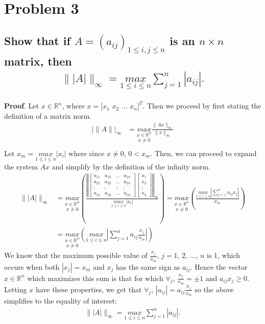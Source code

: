 \documentclass[11pt, letterpaper]{article}
\begin{document}
\section*{Problem 3}
\subsection*{\normalfont Show that if $A=(a_{ij})_{1\leq i,j\leq n}$ is an $n\times n$ matrix, then
\begin{align*}
    \||A|\|_{\infty}=\underset{1\leq i\leq n}{max}\sum_{j=1}^n|a_{ij}|.
\end{align*}}
{\bf Proof}. Let $x\in\mathbb{R}^n$, where $x=[x_1$ $x_2$ $\dots$ $x_n]^T$. Then we proceed by first stating the definition of a matrix norm.
\begin{align*}
    |\|A\||_\infty&=\underset{x\neq 0}{\underset{x\in\mathbb{R}^n}{max}}\frac{\|Ax\|_\infty}{\|x\|_\infty}\\
\end{align*}
Let $x_m=\underset{1\leq i\leq n}{max}|x_i|$ where since $x\neq 0$, $0<x_m$. Then, we can proceed to expand the system $Ax$ and simplify
by the definition of the infinity norm.
\begin{align*}
    \||A|\|_\infty&=\underset{x\neq 0}{\underset{x\in\mathbb{R}^n}{max}}\left(\frac{\left\Vert
    \begin{bmatrix}
        a_{11} & a_{12} & \dots & a_{1n}\\
        a_{21} & a_{22} & \dots & a_{2n}\\
        \vdots & \vdots & \ddots & \vdots\\
        a_{n1} & a_{n2} & \dots & a_{nn}
    \end{bmatrix}
    \begin{bmatrix}
        x_1\\
        x_2\\
        \vdots\\
        x_n
    \end{bmatrix}
    \right\Vert_\infty}{\underset{1\leq i\leq n}{max}|x_i|}\right)
    =\underset{x\neq 0}{\underset{x\in\mathbb{R}^n}{max}}\left(\frac{\underset{1\leq i\leq n}{max}\left|\sum\limits_{j=1}^na_{ij}x_j\right|}{x_m}\right)\\
    &=\underset{x\neq 0}{\underset{x\in\mathbb{R}^n}{max}}\left(\underset{1\leq i\leq n}{max}\left|\sum\limits_{j=1}^na_{ij}\frac{x_j}{x_m}\right|\right)
\end{align*}
We know that the maximum possible value of $\frac{x_j}{x_m}$, $j=1$, $2$, $\dots$, $n$ is 1, which occurs
when both $|x_j|=x_m$ and $x_j$ has the same sign as $a_{ij}$. Hence the vector $x\in\mathbb{R}^n$ which
maximizes this sum is that for which $\forall_j$, $\frac{x_j}{x_m}=\pm 1$ and $a_{ij}x_j\geq 0$. Letting 
$x$ have these properties, we get that $\forall_j$, $|a_{ij}|=a_{ij}\frac{x_j}{x_m}$ so the above 
simplifies to the equality of interest:
\begin{align*}
    \||A|\|_\infty=\underset{1\leq i\leq n}{max}\sum_{j=1}^n|a_{ij}|.
\end{align*}
\end{document}
